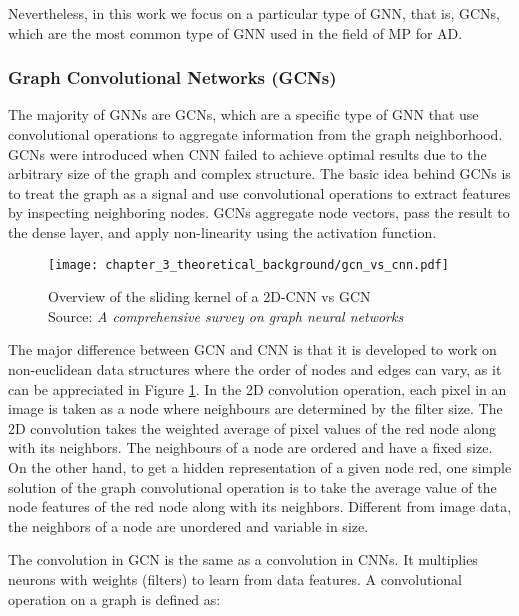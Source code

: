 Nevertheless, in this work we focus on a particular type of \ac{GNN}, that is, \acfp{GCN}, which are the most common type of \ac{GNN} used in the field of \ac{MP} for \ac{AD}.

\subsubsection{Graph Convolutional Networks (GCNs)}
\label{subsubsec:3_gcns}

The majority of \acp{GNN} are \acfp{GCN}, which are a specific type of \ac{GNN} that use convolutional operations to aggregate information from the graph neighborhood. \acp{GCN} were introduced when \ac{CNN} failed to achieve optimal results due to the arbitrary size of the graph and complex structure. The basic idea behind \acp{GCN} is to treat the graph as a signal and use convolutional operations to extract features by inspecting neighboring nodes. \acp{GCN} aggregate node vectors, pass the result to the dense layer, and apply non-linearity using the activation function. 

\begin{figure}[h]
	\centering
	\texttt{[image: chapter\_3\_theoretical\_background/gcn\_vs\_cnn.pdf]}
	\caption[Overview of the sliding kernel of a 2D-CNN vs GCN]{Overview of the sliding kernel of a 2D-CNN vs GCN \\ 
	Source: \textit{A comprehensive survey on graph neural networks} \cite{wu2020comprehensive}}
	\label{fig:chapter_3_theoretical_background/gcn_vs_cnn}
\end{figure}

The major difference between \ac{GCN} and \ac{CNN} is that it is developed to work on non-euclidean data structures where the order of nodes and edges can vary, as it can be appreciated in Figure \ref{fig:chapter_3_theoretical_background/gcn_vs_cnn}. In the 2D convolution operation, each pixel in an image is taken as a node where neighbours are determined by the filter size. The 2D convolution takes the weighted average of pixel values of the red node along with its neighbors. The neighbours of a node are ordered and have a fixed size. On the other hand, to get a hidden representation of a given node red, one simple solution of the graph convolutional operation is to take the average value of the node features of the red node along with its neighbors. Different from image data, the neighbors of a node are unordered and variable in size.

The convolution in \ac{GCN} is the same as a convolution in \acp{CNN}. It multiplies neurons with weights (filters) to learn from data features. A convolutional operation on a graph is defined as:

